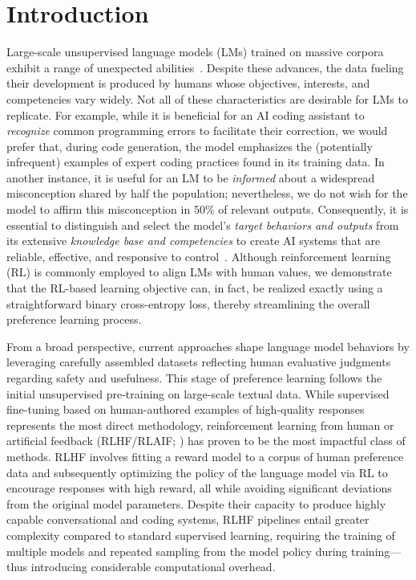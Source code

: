 \section{Introduction}
Large-scale unsupervised language models (LMs) trained on massive corpora exhibit a range of unexpected abilities~\citep{chowdhery2022palm, brown2020language, touvron2023llama, bubeck2023sparks}. Despite these advances, the data fueling their development is produced by humans whose objectives, interests, and competencies vary widely. Not all of these characteristics are desirable for LMs to replicate. For example, while it is beneficial for an AI coding assistant to \textit{recognize} common programming errors to facilitate their correction, we would prefer that, during code generation, the model emphasizes the (potentially infrequent) examples of expert coding practices found in its training data. In another instance, it is useful for an LM to be \textit{informed} about a widespread misconception shared by half the population; nevertheless, we do not wish for the model to affirm this misconception in 50\% of relevant outputs. Consequently, it is essential to distinguish and select the model’s \emph{target behaviors and outputs} from its extensive \textit{knowledge base and competencies} to create AI systems that are reliable, effective, and responsive to control~\citep{ouyang2022training}. Although reinforcement learning (RL) is commonly employed to align LMs with human values, we demonstrate that the RL-based learning objective can, in fact, be realized exactly using a straightforward binary cross-entropy loss, thereby streamlining the overall preference learning process.

From a broad perspective, current approaches shape language model behaviors by leveraging carefully assembled datasets reflecting human evaluative judgments regarding safety and usefulness. This stage of preference learning follows the initial unsupervised pre-training on large-scale textual data. While supervised fine-tuning based on human-authored examples of high-quality responses represents the most direct methodology, reinforcement learning from human or artificial feedback (RLHF/RLAIF; \citep{christiano2017deep,bai2022constitutional}) has proven to be the most impactful class of methods. RLHF involves fitting a reward model to a corpus of human preference data and subsequently optimizing the policy of the language model via RL to encourage responses with high reward, all while avoiding significant deviations from the original model parameters. Despite their capacity to produce highly capable conversational and coding systems, RLHF pipelines entail greater complexity compared to standard supervised learning, requiring the training of multiple models and repeated sampling from the model policy during training—thus introducing considerable computational overhead.

